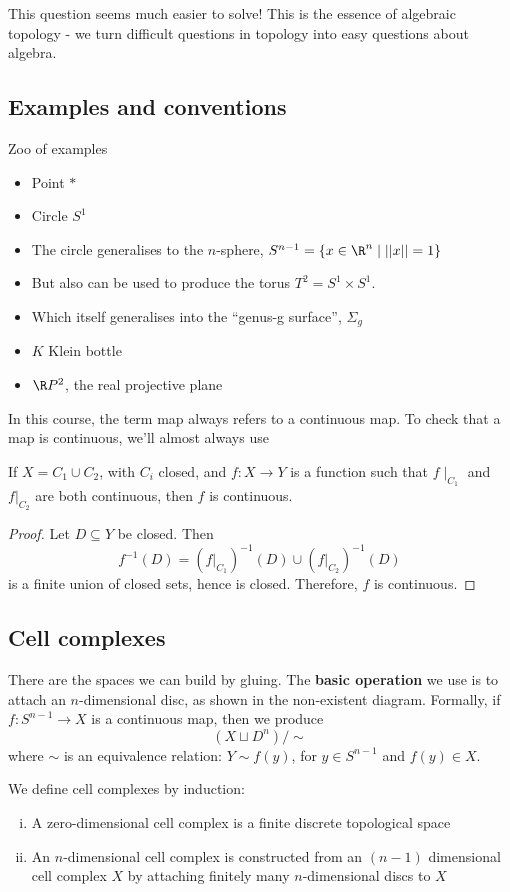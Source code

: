 \documentclass{article}
\begin{document}
This question seems much easier to solve! This is the essence of algebraic topology - we turn difficult questions in topology into easy questions about algebra.

\subsection{Examples and conventions}
Zoo of examples

\begin{itemize}
    \item Point $*$
    \item Circle $S^1$
    \item The circle generalises to the $n$-sphere, $S^{n-1} = \{x \in \R^n \mid ||x|| = 1\}$
    \item But also can be used to produce the torus $T^2 = S^1 \times S^1$.
    \item Which itself generalises into the ``genus-g surface'', $\Sigma_g$
    \item $K$ Klein bottle
    \item $\R P^2$, the real projective plane
\end{itemize}

In this course, the term map always refers to a continuous map.
To check that a map is continuous, we'll almost always use
\begin{lemma}
    If $X = C_1 \cup C_2$, with $C_i$ closed, and $f: X \to Y$ is a function such that $f\mid_{C_1}$ and $f\vert_{C_2}$ are both continuous, then $f$ is continuous.
\end{lemma}
\begin{proof}
    Let $D \subseteq Y$ be closed.  Then
    \begin{equation}
        f^{-1}(D) = (f\vert_{C_1})^{-1} (D) \cup (f\vert_{C_2})^{-1} (D)
    \end{equation}
    is a finite union of closed sets, hence is closed.  Therefore, $f$ is continuous.
\end{proof}
\subsection{Cell complexes}
There are the spaces we can build by gluing.  The \textbf{basic operation} we use is to attach an $n$-dimensional disc, as shown in the non-existent diagram.
Formally, if $f: S^{n-1} \to X$ is a continuous map, then we produce
\begin{equation}
    (X \sqcup D^n) / \sim
\end{equation}
where $\sim$ is an equivalence relation: $Y \sim f(y)$, for $y \in S^{n-1}$ and $f(y) \in X$.
\begin{defi}
    We define cell complexes by induction:
    \begin{enumerate}[(i)] %
        \item A zero-dimensional cell complex is a finite discrete topological space
        \item An $n$-dimensional cell complex is constructed from an $(n-1)$ dimensional cell complex $X$ by attaching finitely many $n$-dimensional discs to $X$
    \end{enumerate}
\end{defi}
\end{document}
